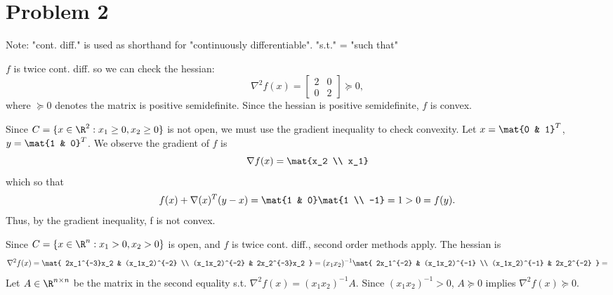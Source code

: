 \documentclass{homework}
\begin{document}
\section{Problem 2}
Note:
"cont. diff." is used as shorthand for "continuously differentiable".
"s.t." = "such that"
\begin{letterenum}
    \item $f$ is twice cont. diff. so we can check the hessian:
    \begin{equation}
        \nabla^2 f(x) = \begin{bmatrix}
            2 & 0 \\ 0 & 2
        \end{bmatrix} \succeq 0,
    \end{equation}
    where $\succeq 0$ denotes the matrix is positive semidefinite. Since the
    hessian is positive semidefinite, $f$ is convex.

    \item Since $C = \{x\in\R^2: x_1\geq0, x_2\geq0\}$ is not open, we must
        use the gradient inequality to check convexity.
        Let $x = \mat{0 & 1}^T$, $y = \mat{1 & 0}^T$.
        We observe the gradient of $f$ is
        \begin{equation}
            \nabla f(x) = \mat{x_2 \\ x_1}
        \end{equation}
        which so that
        \begin{equation}
            f(x) + \nabla(x)^T (y-x) = \mat{1 & 0} \mat{1 \\ -1} = 1 > 0 = f(y).
        \end{equation}
        Thus, by the gradient inequality, f is not convex.

    \item Since $C = \{x\in\R^n: x_1 > 0, x_2>0\}$ is open, and $f$ is twice
    cont. diff., second order methods apply. The hessian is
    \begin{equation}
        \nabla^2 f(x) = \mat{
            2x_1^{-3}x_2 & (x_1x_2)^{-2} \\
            (x_1x_2)^{-2} &  2x_2^{-3}x_2
        } = (x_1x_2)^{-1}\mat{
            2x_1^{-2} & (x_1x_2)^{-1} \\
            (x_1x_2)^{-1} & 2x_2^{-2}
        } = 
    \end{equation}
    Let $A\in\R^{n \times n}$ be the matrix in the second equality
    s.t. $\nabla^2 f(x) = (x_1x_2)^{-1} A$. Since $(x_1x_2)^{-1} > 0$,
    $A \succeq 0$ implies $\nabla^2 f(x) \succeq 0$.


\end{letterenum}
\end{document}
